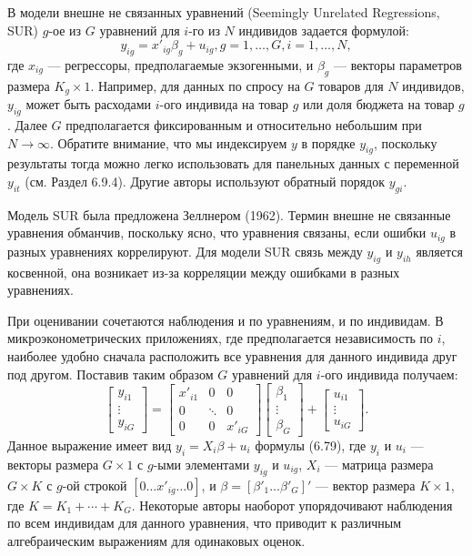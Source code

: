 В модели внешне не связанных уравнений (Seemingly Unrelated Regressions, SUR) $g$-ое из $G$ уравнений
для $i$-го из $N$ индивидов задается формулой:
\begin{equation}
y_{ig}=x'_{ig} \beta_g + u_{ig}, g=1, \dots, G, i=1, \dots, N,
\end{equation}
где $x_{ig}$ --- регрессоры, предполагаемые экзогенными, и $\beta_g$ --- векторы параметров размера $K_g \times 1$. Например, для данных по спросу на $G$ товаров для $N$ индивидов, $y_{ig}$ может быть расходами $i$-ого индивида на товар $g$ или доля бюджета на товар $g$. Далее $G$ предполагается фиксированным и относительно небольшим при $N \rightarrow \infty$. Обратите внимание, что мы индексируем $y$ в порядке $y_{ig}$, поскольку результаты тогда можно легко использовать для панельных данных с переменной $y_{it}$ (см. Раздел 6.9.4). Другие авторы используют обратный порядок $y_{gi}$.

Модель SUR была предложена Зеллнером (1962). Термин внешне не связанные уравнения обманчив, поскольку ясно, что уравнения связаны, если ошибки $u_{ig}$ в разных уравнениях коррелируют. Для модели SUR связь между $y_{ig}$ и $y_{ih}$ является косвенной, она возникает из-за корреляции между ошибками в разных уравнениях.

При оценивании сочетаются наблюдения и по уравнениям, и по индивидам. В микроэконометрических приложениях, где предполагается независимость по $i$, наиболее удобно сначала расположить все уравнения для данного индивида друг под другом. Поставив таким образом $G$ уравнений для $i$-ого индивида получаем:
\begin{equation}
\begin{bmatrix} y_{i1} \\ \vdots \\ y_{iG} \end{bmatrix} = \begin{bmatrix}
x'_{i1} & 0 & 0 \\ 0 & \ddots & 0 \\ 0 & 0 & x'_{iG} \end{bmatrix} \begin{bmatrix} \beta_{1} \\ \vdots \\ \beta_{G} \end{bmatrix} + \begin{bmatrix} u_{i1} \\ \vdots \\ u_{iG} \end{bmatrix}.
\end{equation}
Данное выражение имеет вид $y_i=X_i \beta + u_i $ формулы (6.79), где $y_i$ и $u_i$ --- векторы размера $G \times 1$ с $g$-ыми элементами $y_{ig}$ и $u_{ig}$, $X_i$ --- матрица размера $G \times K$ с $g$-ой строкой $[0 \dots x'_{ig} \dots 0]$, и $\beta=[\beta'_1 \dots \beta'_G]'$ --- вектор размера $K \times 1$, где $K=K_1+ \cdots + K_G$. Некоторые авторы наоборот упорядочивают наблюдения по  всем индивидам для данного уравнения, что приводит к различным алгебраическим выражениям для одинаковых оценок.

